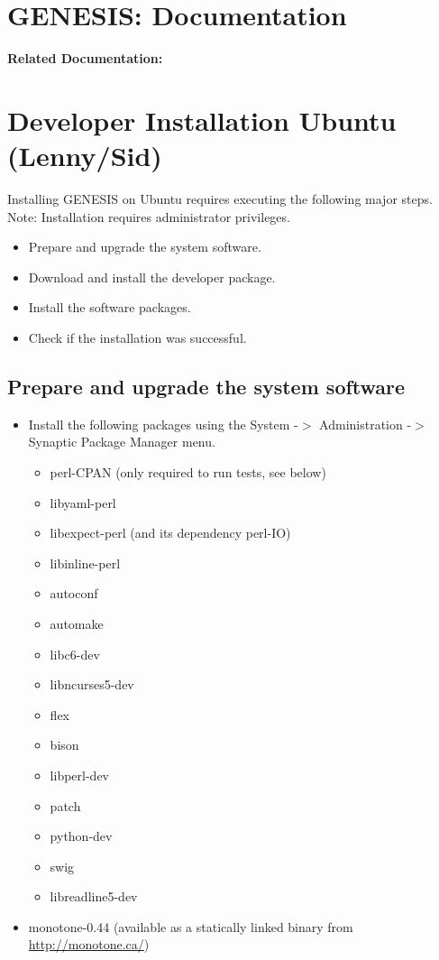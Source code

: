 \documentclass[12pt]{article}
\begin{document}
\section*{GENESIS: Documentation}

{\bf Related Documentation:}

\section*{Developer Installation Ubuntu (Lenny/Sid)}

Installing GENESIS on Ubuntu requires executing the following major steps. Note: Installation requires administrator privileges.
\begin{itemize}
   \item[] Prepare and upgrade the system software.
   \item[] Download and install the developer package.
   \item[] Install the software packages.
   \item[] Check if the installation was successful. 
\end{itemize}

\subsection*{Prepare and upgrade the system software}

\begin{itemize}
   \item[] Install the following packages using the System -$>$ Administration -$>$ Synaptic Package Manager menu.
      \begin{itemize}
         \item perl-CPAN (only required to run tests, see below)
         \item libyaml-perl
         \item libexpect-perl (and its dependency perl-IO)
         \item libinline-perl
         \item autoconf
         \item automake
         \item libc6-dev
         \item libncurses5-dev
         \item flex
         \item bison
         \item libperl-dev
         \item patch
         \item python-dev
         \item swig
         \item libreadline5-dev 
      \end{itemize}
   \item[] monotone-0.44 (available as a statically linked binary from \href{http://monotone.ca/}{http://monotone.ca/}) 
 \end{itemize}
\end{document}
